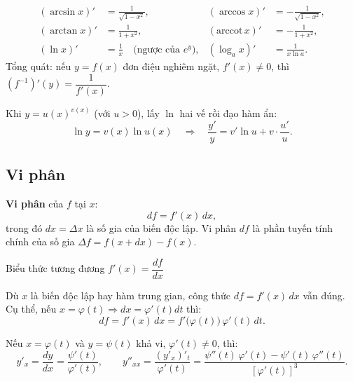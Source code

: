 \documentclass[12pt,a4paper]{article}
\begin{document}
\begin{congthuc}[title={Đạo hàm các hàm ngược thường gặp}]
  \begin{align*}
    (\arcsin x)' &= \frac{1}{\sqrt{1-x^2}}, & (\arccos x)' &= -\frac{1}{\sqrt{1-x^2}}, \\
    (\arctan x)' &= \frac{1}{1+x^2}, & (\text{arccot}\,x)' &= -\frac{1}{1+x^2}, \\
    (\ln x)' &= \frac{1}{x} \quad\text{(ngược của } e^y\text{)}, & (\log_a x)' &= \frac{1}{x\ln a}.
  \end{align*}
  Tổng quát: nếu $y = f(x)$ đơn điệu nghiêm ngặt, $f'(x) \ne 0$, thì $(f^{-1})'(y) = \dfrac{1}{f'(x)}$.
\end{congthuc}

\begin{phuongphap}[title={Đạo hàm logarit}]
  Khi $y = u(x)^{v(x)}$ (với $u > 0$), lấy $\ln$ hai vế rồi đạo hàm ẩn:
  \[
    \ln y = v(x) \ln u(x) \quad\Rightarrow\quad \frac{y'}{y} = v' \ln u + v \cdot \frac{u'}{u}.
  \]
\end{phuongphap}

\subsection{Vi phân}

\begin{dinhnghia}
  \textbf{Vi phân} của $f$ tại $x$:
  \[
    df = f'(x)\, dx,
  \]
  trong đó $dx = \Delta x$ là số gia của biến độc lập. Vi phân $df$ là phần tuyến tính chính của số gia $\Delta f = f(x + dx) - f(x)$.

  Biểu thức tương đương $f'(x) = \dfrac{df}{dx}$
\end{dinhnghia}

\begin{tinhchat}[title={Tính bất biến của dạng vi phân}]
  Dù $x$ là biến độc lập hay hàm trung gian, công thức $df = f'(x)\,dx$ vẫn đúng. Cụ thể, nếu $x = \varphi(t) \Rightarrow dx = \varphi'(t)dt$ thì:
  \[
    df = f'(x)\,dx = f'\bigl(\varphi(t)\bigr)\,\varphi'(t)\,dt.
  \]
\end{tinhchat}

\begin{congthuc}[title={Đạo hàm hàm cho bởi phương trình tham số}]
  Nếu $x = \varphi(t)$ và $y = \psi(t)$ khả vi, $\varphi'(t) \ne 0$, thì:
  \[
    y'_x = \frac{dy}{dx} = \frac{\psi'(t)}{\varphi'(t)}, \qquad y''_{xx} = \frac{(y'_x)'_t}{\varphi'(t)} = \frac{\psi''(t)\,\varphi'(t) - \psi'(t)\,\varphi''(t)}{[\varphi'(t)]^3}.
  \]
\end{congthuc}
\end{document}
